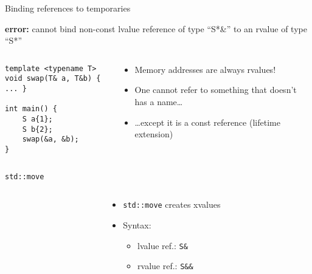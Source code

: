 \begin{frame}[fragile]{Binding references to temporaries}
    \begin{center}
        \textbf{\textcolor{vertexDarkRed}{error:}} cannot bind non-const lvalue reference of type \enquote{S*\&} to an rvalue of type \enquote{S*}
    \end{center}
    \begin{columns}
        \begin{column}{.4\textwidth}
            \begin{lstlisting}
template <typename T>
void swap(T& a, T&b) { ... }

int main() {
    S a{1};
    S b{2};
    swap(&a, &b);
}
            \end{lstlisting}
        \end{column}
        \begin{column}{.55\textwidth}
            \begin{itemize}
                \item Memory addresses are always rvalues!
                \item One cannot refer to something that doesn't has a name\ldots
                \item \ldots except it is a const reference (lifetime extension)
            \end{itemize}
        \end{column}
    \end{columns}
\end{frame}

\begin{frame}
    \centering
\end{frame}

\begin{frame}[fragile]{\texttt{std::move}}
    \begin{columns}
        \begin{column}{.55\textwidth}
        \end{column}
        \begin{column}{.4\textwidth}
            \begin{itemize}
                \item \texttt{std::move} creates xvalues
                \item Syntax:
                \begin{itemize}
                    \item lvalue ref.: \texttt{S\&}
                    \item rvalue ref.: \texttt{S\&\&}
                \end{itemize}
            \end{itemize}
        \end{column}
    \end{columns}
\end{frame}

